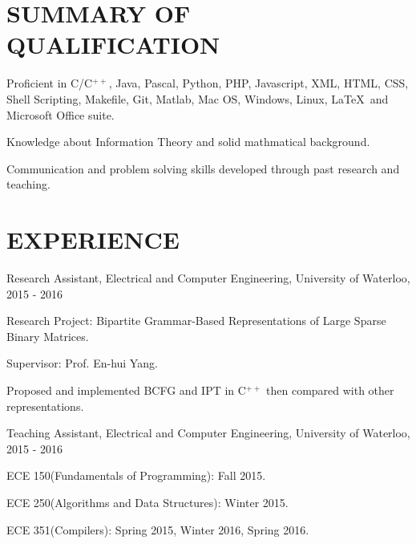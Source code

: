 \documentclass{res}
\newcommand{\parsp}{\vspace{-0.7\baselineskip}}
\newcommand{\additemindent}{\addtolength{\itemindent}{1em}}
\begin{document}
\begin{resume}

\parsp
\section{SUMMARY OF QUALIFICATION}
	\begin{asparaitem}
		\item 	Proficient in C/C$^{++}$, Java, Pascal, Python, PHP, Javascript, XML, HTML, CSS, Shell Scripting, Makefile, Git, Matlab, Mac OS, Windows, Linux, \LaTeX\  and Microsoft Office suite.
		\item 	Knowledge about Information Theory and solid mathmatical background.
		\item 	Communication and problem solving skills developed through past research and teaching.
	\end{asparaitem}


\parsp
\section{EXPERIENCE}
\begin{asparaitem}
	\item Research Assistant, Electrical and Computer Engineering, University of Waterloo, 2015 - 2016
		\begin{asparaitem}
			\additemindent
			\item Research Project: Bipartite Grammar-Based Representations of Large Sparse Binary Matrices.
			\item Supervisor: Prof. En-hui Yang. 
			\item Proposed and implemented BCFG and IPT in C$^{++}$ then compared with other representations.
		\end{asparaitem}

	\item Teaching Assistant, Electrical and Computer Engineering, University of Waterloo, 2015 - 2016
		\begin{asparaitem}
			\additemindent
			\item ECE 150(Fundamentals of Programming): Fall 2015.
			\item ECE 250(Algorithms and Data Structures): Winter 2015.
			\item ECE 351(Compilers): Spring 2015, Winter 2016, Spring 2016.
		\end{asparaitem}


\end{asparaitem}
\end{resume}
\end{document}
